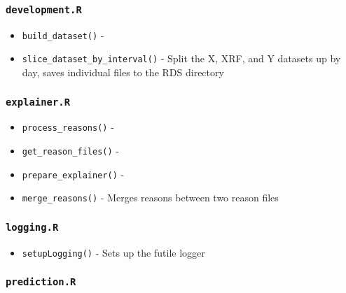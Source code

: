 \documentclass[
]{book}
\providecommand{\tightlist}{%
  \setlength{\itemsep}{0pt}\setlength{\parskip}{0pt}}
\begin{document}
\hypertarget{development.r-1}{%
\subsubsection{\texorpdfstring{\texttt{development.R}}{development.R}}\label{development.r-1}}

\begin{itemize}
\tightlist
\item
  \texttt{build\_dataset()} -
\item
  \texttt{slice\_dataset\_by\_interval()} - Split the X, XRF, and Y datasets up by day, saves individual files to the RDS directory
\end{itemize}

\hypertarget{explainer.r}{%
\subsubsection{\texorpdfstring{\texttt{explainer.R}}{explainer.R}}\label{explainer.r}}

\begin{itemize}
\tightlist
\item
  \texttt{process\_reasons()} -
\item
  \texttt{get\_reason\_files()} -
\item
  \texttt{prepare\_explainer()} -
\item
  \texttt{merge\_reasons()} - Merges reasons between two reason files
\end{itemize}

\hypertarget{logging.r-1}{%
\subsubsection{\texorpdfstring{\texttt{logging.R}}{logging.R}}\label{logging.r-1}}

\begin{itemize}
\tightlist
\item
  \texttt{setupLogging()} - Sets up the futile logger
\end{itemize}

\hypertarget{prediction.r-1}{%
\subsubsection{\texorpdfstring{\texttt{prediction.R}}{prediction.R}}\label{prediction.r-1}}
\end{document}
